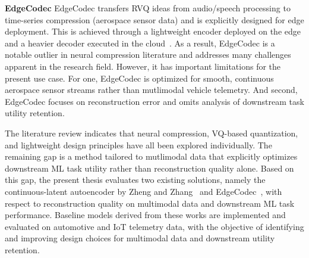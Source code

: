 \textbf{EdgeCodec} EdgeCodec transfers RVQ ideas from audio/speech processing to time-series compression (aerospace sensor data) and is explicitly designed for edge deployment. This is achieved through a lightweight encoder deployed on the edge and a heavier decoder executed in the cloud~\cite{Hodo2025}. As a result, EdgeCodec is a notable outlier in neural compression literature and addresses many challenges apparent in the research field. However, it has important limitations for the present use case. For one, EdgeCodec is optimized for smooth, continuous aerospace sensor streams rather than mutlimodal vehicle telemetry. And second, EdgeCodec focuses on reconstruction error and omits analysis of downstream task utility retention.

The literature review indicates that neural compression, VQ-based quantization, and lightweight design principles have all been explored individually. The remaining gap is a method tailored to mutlimodal data that explicitly optimizes downstream ML task utility rather than reconstruction quality alone. Based on this gap, the present thesis evaluates two existing solutions, namely the continuous-latent autoencoder by Zheng and Zhang~\cite{Zheng2023} and EdgeCodec~\cite{Hodo2025}, with respect to reconstruction quality on multimodal data and downstream ML task performance. Baseline models derived from these works are implemented and evaluated on automotive and IoT telemetry data, with the objective of identifying and improving design choices for multimodal data and downstream utility retention.
